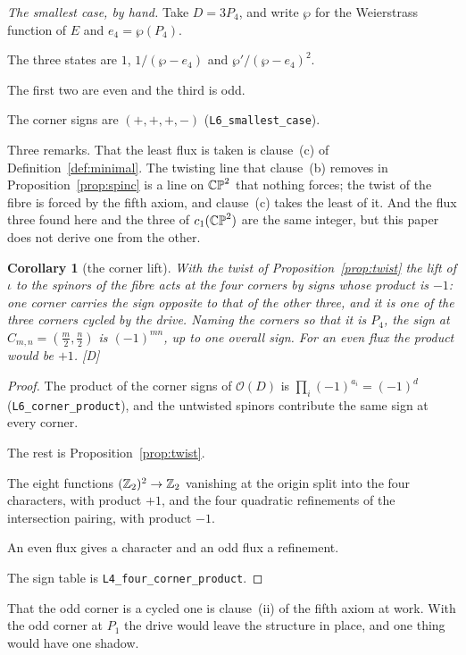 \documentclass[11pt,a4paper]{article}
\theoremstyle{plain}
\newtheorem{corollary}[theorem]{Corollary}
\theoremstyle{definition}
\theoremstyle{remark}
\newcommand{\rigD}{[\textup{D}]}
\begin{document}
\emph{The smallest case, by hand.} Take $D=3P_{4}$, and write $\wp$ for the Weierstrass function of $E$ and $e_{4}=\wp(P_{4})$.

The three states are $1$, $1/(\wp-e_{4})$ and $\wp'/(\wp-e_{4})^{2}$.

The first two are even and the third is odd.

The corner signs are $(+,+,+,-)$ (\texttt{L6\_smallest\_case}).

Three remarks. That the least flux is taken is clause~(c) of Definition~\ref{def:minimal}. The twisting line that clause~(b) removes in Proposition~\ref{prop:spinc} is a line on $\mathbb{CP}^2$ that nothing forces; the twist of the fibre is forced by the fifth axiom, and clause~(c) takes the least of it. And the flux three found here and the three of $c_{1}(\mathbb{CP}^2)$ are the same integer, but this paper does not derive one from the other.

\begin{corollary}[the corner lift]\label{cor:lift}
With the twist of Proposition~\ref{prop:twist} the lift of $\iota$ to the spinors of the fibre acts at the four corners by signs whose product is $-1$: one corner carries the sign opposite to that of the other three, and it is one of the three corners cycled by the drive. Naming the corners so that it is $P_{4}$, the sign at $C_{m,n}=(\tfrac m2,\tfrac n2)$ is $(-1)^{mn}$, up to one overall sign. For an even flux the product would be $+1$. \rigD
\end{corollary}

\begin{proof}
The product of the corner signs of $\mathcal{O}(D)$ is $\prod_{i}(-1)^{a_{i}}=(-1)^{d}$ (\texttt{L6\_corner\_product}), and the untwisted spinors contribute the same sign at every corner.

The rest is Proposition~\ref{prop:twist}.

The eight functions $(\mathbb{Z}_{2})^{2}\to\mathbb{Z}_{2}$ vanishing at the origin split into the four characters, with product $+1$, and the four quadratic refinements of the intersection pairing, with product $-1$.

An even flux gives a character and an odd flux a refinement.

The sign table is \texttt{L4\_four\_corner\_product}.
\end{proof}

That the odd corner is a cycled one is clause~(ii) of the fifth axiom at work. With the odd corner at $P_{1}$ the drive would leave the structure in place, and one thing would have one shadow.
\end{document}
